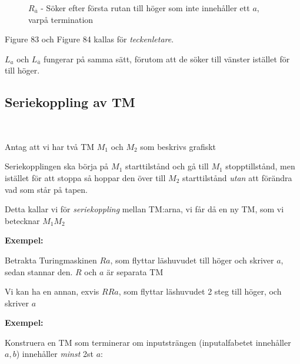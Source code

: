 \begin{figure}[ht!]
    \centering
    \caption{$R_{\bar{a}}$ - Söker efter första rutan till höger som inte innehåller ett $a$, varpå termination}
\end{figure}\par
\noindent Figure 83 och Figure 84 kallas för \textit{teckenletare}.\par
\noindent $L_a$ och $L_{\bar{a}}$ fungerar på samma sätt, förutom att de söker till vänster istället för till höger.
\par\bigskip
\subsection{Seriekoppling av TM}\hfill\\\par
\noindent Antag att vi har två TM $M_1$ och $M_2$ som beskrivs grafiskt\par
\noindent Seriekopplingen ska börja på $M_1$ starttilstånd och gå till $M_1$ stopptillstånd, men istället för att stoppa så hoppar den över till $M_2$ starttilstånd \textit{utan} att förändra vad som står på tapen.\par
\noindent Detta kallar vi för \textit{seriekoppling} mellan TM:arna, vi får då en ny TM, som vi betecknar $M_1M_2$ 
\par\bigskip
\noindent\textbf{Exempel:}\par
\noindent Betrakta Turingmaskinen $Ra$, som flyttar läshuvudet till höger och skriver $a$, sedan stannar den. $R$ och $a$ är separata TM\par
\noindent Vi kan ha en annan, exvis $RRa$, som flyttar läshuvudet 2 steg till höger, och skriver $a$
\par\bigskip
\noindent\textbf{Exempel:}\par
\noindent Konstruera en TM som terminerar om inputsträngen (inputalfabetet innehåller $a,b$) innehåller \textit{minst} 2st $a$:
\begin{figure}[ht!]
    \centering
    \caption{}
\end{figure}
